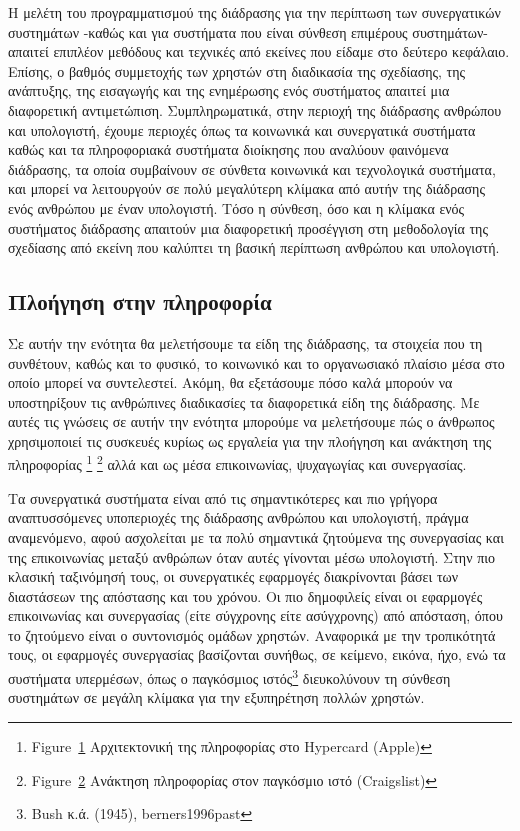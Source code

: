 \documentclass[
]{article}
\begin{document}
Η μελέτη του προγραμματισμού της διάδρασης για την περίπτωση των
συνεργατικών συστημάτων -καθώς και για συστήματα που είναι σύνθεση
επιμέρους συστημάτων- απαιτεί επιπλέον μεθόδους και τεχνικές από εκείνες
που είδαμε στο δεύτερο κεφάλαιο. Επίσης, ο βαθμός συμμετοχής των χρηστών
στη διαδικασία της σχεδίασης, της ανάπτυξης, της εισαγωγής και της
ενημέρωσης ενός συστήματος απαιτεί μια διαφορετική αντιμετώπιση.
Συμπληρωματικά, στην περιοχή της διάδρασης ανθρώπου και υπολογιστή,
έχουμε περιοχές όπως τα κοινωνικά και συνεργατικά συστήματα καθώς και τα
πληροφοριακά συστήματα διοίκησης που αναλύουν φαινόμενα διάδρασης, τα
οποία συμβαίνουν σε σύνθετα κοινωνικά και τεχνολογικά συστήματα, και
μπορεί να λειτουργούν σε πολύ μεγαλύτερη κλίμακα από αυτήν της διάδρασης
ενός ανθρώπου με έναν υπολογιστή. Τόσο η σύνθεση, όσο και η κλίμακα ενός
συστήματος διάδρασης απαιτούν μια διαφορετική προσέγγιση στη μεθοδολογία
της σχεδίασης από εκείνη που καλύπτει τη βασική περίπτωση ανθρώπου και
υπολογιστή.

\hypertarget{ux3c0ux3bbux3bfux3aeux3b3ux3b7ux3c3ux3b7-ux3c3ux3c4ux3b7ux3bd-ux3c0ux3bbux3b7ux3c1ux3bfux3c6ux3bfux3c1ux3afux3b1}{%
\subsection{Πλοήγηση στην
πληροφορία}\label{ux3c0ux3bbux3bfux3aeux3b3ux3b7ux3c3ux3b7-ux3c3ux3c4ux3b7ux3bd-ux3c0ux3bbux3b7ux3c1ux3bfux3c6ux3bfux3c1ux3afux3b1}}

Σε αυτήν την ενότητα θα μελετήσουμε τα είδη της διάδρασης, τα στοιχεία
που τη συνθέτουν, καθώς και το φυσικό, το κοινωνικό και το οργανωσιακό
πλαίσιο μέσα στο οποίο μπορεί να συντελεστεί. Ακόμη, θα εξετάσουμε πόσο
καλά μπορούν να υποστηρίξουν τις ανθρώπινες διαδικασίες τα διαφορετικά
είδη της διάδρασης. Με αυτές τις γνώσεις σε αυτήν την ενότητα μπορούμε
να μελετήσουμε πώς ο άνθρωπος χρησιμοποιεί τις συσκευές κυρίως ως
εργαλεία για την πλοήγηση και ανάκτηση της πληροφορίας \footnote{Figure~\protect\hyperlink{fig:hypercard-layout}{1}
  Αρχιτεκτονική της πληροφορίας στο Hypercard (Apple)} \footnote{Figure~\protect\hyperlink{fig:web-search}{2}
  Ανάκτηση πληροφορίας στον παγκόσμιο ιστό (Craigslist)} αλλά και ως
μέσα επικοινωνίας, ψυχαγωγίας και συνεργασίας.

Τα συνεργατικά συστήματα είναι από τις σημαντικότερες και πιο γρήγορα
αναπτυσσόμενες υποπεριοχές της διάδρασης ανθρώπου και υπολογιστή, πράγμα
αναμενόμενο, αφού ασχολείται με τα πολύ σημαντικά ζητούμενα της
συνεργασίας και της επικοινωνίας μεταξύ ανθρώπων όταν αυτές γίνονται
μέσω υπολογιστή. Στην πιο κλασική ταξινόμησή τους, οι συνεργατικές
εφαρμογές διακρίνονται βάσει των διαστάσεων της απόστασης και του
χρόνου. Οι πιο δημοφιλείς είναι οι εφαρμογές επικοινωνίας και
συνεργασίας (είτε σύγχρονης είτε ασύγχρονης) από απόσταση, όπου το
ζητούμενο είναι ο συντονισμός ομάδων χρηστών. Αναφορικά με την
τροπικότητά τους, οι εφαρμογές συνεργασίας βασίζονται συνήθως, σε
κείμενο, εικόνα, ήχο, ενώ τα συστήματα υπερμέσων, όπως ο παγκόσμιος
ιστός\footnote{Bush κ.ά. (1945), berners1996past} διευκολύνουν τη
σύνθεση συστημάτων σε μεγάλη κλίμακα για την εξυπηρέτηση πολλών χρηστών.
\end{document}
